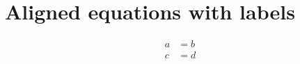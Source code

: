 \section{Aligned equations with labels}

\begin{align}
a &= b \label{eq:first} \\
c &= d \label{eq:second}
\end{align}
